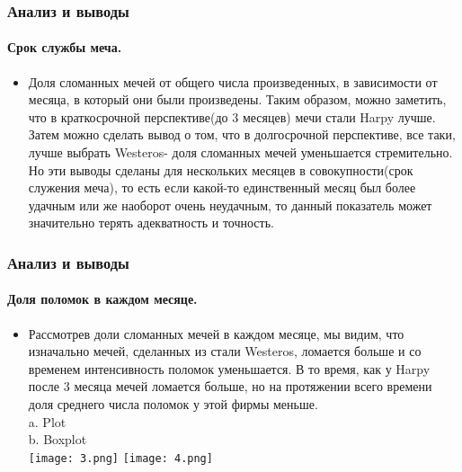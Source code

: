 \documentclass[8pt,pdf,hyperref={unicode}]{beamer}
\begin{document}
	\begin{frame}
		\frametitle{Анализ и выводы}
	\framesubtitle{Срок службы меча.}
		\begin{itemize}
			\item  Доля сломанных мечей от общего числа произведенных, в зависимости от месяца, в который они были произведены. Таким образом, можно заметить, что в краткосрочной перспективе(до 3 месяцев) мечи стали Harpy лучше. Затем можно сделать вывод о том, что в долгосрочной перспективе, все таки, лучше выбрать Westeros- доля сломанных мечей уменьшается стремительно. Но эти выводы сделаны для нескольких месяцев в совокупности(срок служения меча), то есть если какой-то единственный месяц был более удачным или же наоборот очень неудачным, то данный показатель может значительно терять адекватность и точность.\\
			
		\end{itemize}
	\end{frame}
	
	\begin{frame}
	\frametitle{Анализ и выводы}
	\framesubtitle{Доля поломок в каждом месяце.}
	\begin{itemize}
		\item  Рассмотрев доли сломанных мечей в каждом месяце, мы видим, что изначально мечей, сделанных из стали Westeros, ломается больше и со временем интенсивность поломок уменьшается. В то время, как у Harpy после 3 месяца мечей ломается больше, но на протяжении всего времени доля среднего числа поломок у этой фирмы меньше. \\
		a. Plot \\ 
		b. Boxplot \\
		
		\texttt{[image: 3.png]}	
		\texttt{[image: 4.png]}		 
	\end{itemize}
	\end{frame}	
	
\end{document}
